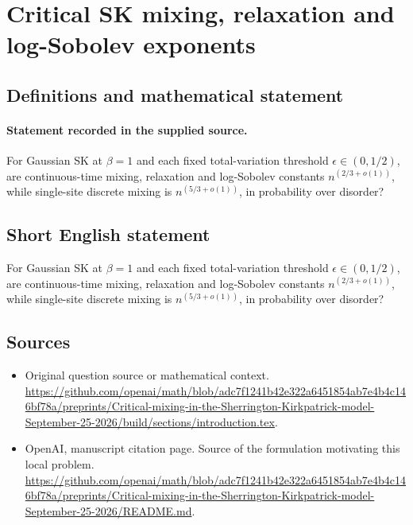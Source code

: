 \documentclass[11pt]{article}
\begin{document}
\section*{Critical SK mixing, relaxation and log-Sobolev exponents}\label{30007387}
\subsection{Definitions and mathematical statement}
\paragraph{Statement recorded in the supplied source.}
For Gaussian SK at $\beta =1$ and each fixed total-variation threshold $\epsilon \in (0,1/2)$, are continuous-time mixing, relaxation and log-Sobolev constants $n^(2/3+o(1))$, while single-site discrete mixing is $n^(5/3+o(1))$, in probability over disorder?
\subsection{Short English statement}
For Gaussian SK at $\beta =1$ and each fixed total-variation threshold $\epsilon \in (0,1/2)$, are continuous-time mixing, relaxation and log-Sobolev constants $n^(2/3+o(1))$, while single-site discrete mixing is $n^(5/3+o(1))$, in probability over disorder?
\subsection{Sources}
\begin{itemize}
\item[S1] Original question source or mathematical context.
\url{https://github.com/openai/math/blob/adc7f1241b42e322a6451854ab7e4b4c146bf78a/preprints/Critical-mixing-in-the-Sherrington-Kirkpatrick-model-September-25-2026/build/sections/introduction.tex}.
\item[S2] OpenAI, manuscript citation page. Source of the formulation motivating this local problem.
\url{https://github.com/openai/math/blob/adc7f1241b42e322a6451854ab7e4b4c146bf78a/preprints/Critical-mixing-in-the-Sherrington-Kirkpatrick-model-September-25-2026/README.md}.
\end{itemize}
\end{document}
